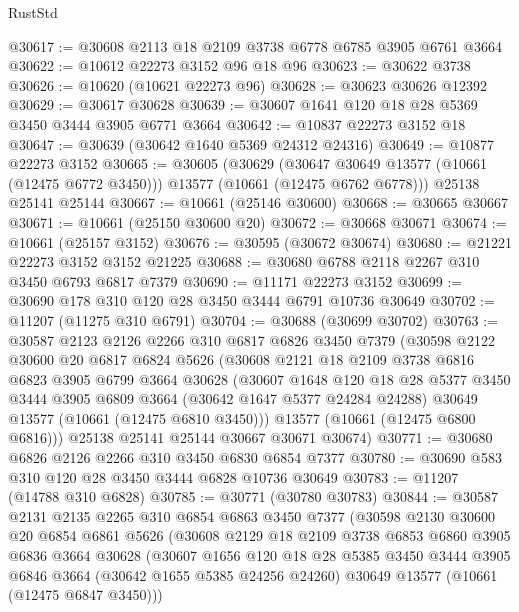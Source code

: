 \begin{lexlean}{RustStd}
\begin{coremodule}
@30617 := @30608 @2113 @18 @2109 @3738 @6778 @6785 @3905 @6761 @3664
@30622 := @10612 @22273 @3152 @96 @18 @96
@30623 := @30622 @3738
@30626 := @10620 (@10621 @22273 @96)
@30628 := @30623 @30626 @12392
@30629 := @30617 @30628
@30639 := @30607 @1641 @120 @18 @28 @5369 @3450 @3444 @3905 @6771 @3664
@30642 := @10837 @22273 @3152 @18
@30647 := @30639 (@30642 @1640 @5369 @24312 @24316)
@30649 := @10877 @22273 @3152
@30665 := @30605
    (@30629
      (@30647 @30649 @13577 (@10661 (@12475 @6772 @3450)))
      @13577
      (@10661 (@12475 @6762 @6778)))
    @25138
    @25141
    @25144
@30667 := @10661 (@25146 @30600)
@30668 := @30665 @30667
@30671 := @10661 (@25150 @30600 @20)
@30672 := @30668 @30671
@30674 := @10661 (@25157 @3152)
@30676 := @30595 (@30672 @30674)
@30680 := @21221 @22273 @3152 @3152 @21225
@30688 := @30680 @6788 @2118 @2267 @310 @3450 @6793 @6817 @7379
@30690 := @11171 @22273 @3152
@30699 := @30690 @178 @310 @120 @28 @3450 @3444 @6791 @10736 @30649
@30702 := @11207 (@11275 @310 @6791)
@30704 := @30688 (@30699 @30702)
@30763 := @30587
    @2123
    @2126
    @2266
    @310
    @6817
    @6826
    @3450
    @7379
    (@30598
      @2122
      @30600
      @20
      @6817
      @6824
      @5626
      (@30608
        @2121
        @18
        @2109
        @3738
        @6816
        @6823
        @3905
        @6799
        @3664
        @30628
        (@30607
          @1648
          @120
          @18
          @28
          @5377
          @3450
          @3444
          @3905
          @6809
          @3664
          (@30642 @1647 @5377 @24284 @24288)
          @30649
          @13577
          (@10661 (@12475 @6810 @3450)))
        @13577
        (@10661 (@12475 @6800 @6816)))
      @25138
      @25141
      @25144
      @30667
      @30671
      @30674)
@30771 := @30680 @6826 @2126 @2266 @310 @3450 @6830 @6854 @7377
@30780 := @30690 @583 @310 @120 @28 @3450 @3444 @6828 @10736 @30649
@30783 := @11207 (@14788 @310 @6828)
@30785 := @30771 (@30780 @30783)
@30844 := @30587
    @2131
    @2135
    @2265
    @310
    @6854
    @6863
    @3450
    @7377
    (@30598
      @2130
      @30600
      @20
      @6854
      @6861
      @5626
      (@30608
        @2129
        @18
        @2109
        @3738
        @6853
        @6860
        @3905
        @6836
        @3664
        @30628
        (@30607
          @1656
          @120
          @18
          @28
          @5385
          @3450
          @3444
          @3905
          @6846
          @3664
          (@30642 @1655 @5385 @24256 @24260)
          @30649
          @13577
          (@10661 (@12475 @6847 @3450)))

\end{coremodule}
\end{lexlean}
